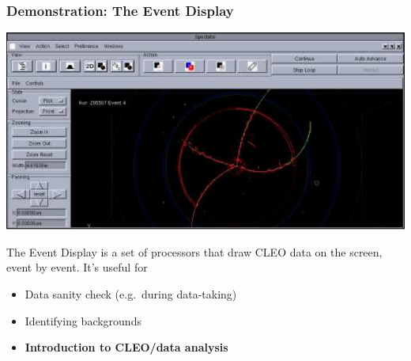 \documentclass[12pt,compress]{beamer}
\begin{document}
\begin{frame}
\sf
\vfill
\begin{center}
\end{center}

\vfill
{}

\end{frame}

\begin{frame}
\frametitle{Demonstration: The Event Display}

\begin{center}
\includegraphics[width=0.8\linewidth]{eventdisplay}
\end{center}

The Event Display is a set of processors that draw CLEO data on the
screen, event by event.  It's useful for
\begin{itemize}
\item Data sanity check (e.g.\ during data-taking)
\item Identifying backgrounds
\item {\bf Introduction to CLEO/data analysis}
\end{itemize}

\end{frame}
\end{document}
